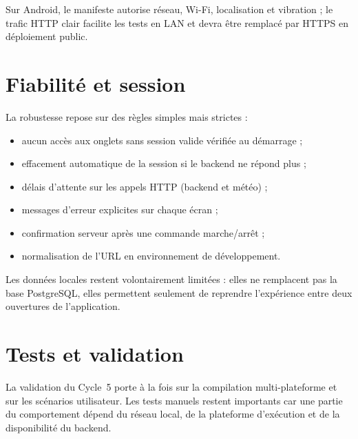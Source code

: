 \documentclass[a4paper,12pt]{report}
\begin{document}
	Sur Android, le manifeste autorise réseau, Wi-Fi, localisation et vibration ;
	le trafic HTTP clair facilite les tests en LAN et devra être remplacé par
	HTTPS en déploiement public.
	
	\section{Fiabilité et session}
	
	La robustesse repose sur des règles simples mais strictes :
	\begin{itemize}
		\item aucun accès aux onglets sans session valide vérifiée au démarrage ;
		\item effacement automatique de la session si le backend ne répond plus ;
		\item délais d'attente sur les appels HTTP (backend et météo) ;
		\item messages d'erreur explicites sur chaque écran ;
		\item confirmation serveur après une commande marche/arrêt ;
		\item normalisation de l'URL en environnement de développement.
	\end{itemize}
	
	Les données locales restent volontairement limitées : elles ne remplacent pas
	la base PostgreSQL, elles permettent seulement de reprendre l'expérience entre
	deux ouvertures de l'application.
	
	\section{Tests et validation}
	
	La validation du Cycle~5 porte à la fois sur la compilation multi-plateforme et
	sur les scénarios utilisateur. Les tests manuels restent importants car une
	partie du comportement dépend du réseau local, de la plateforme d'exécution et
	de la disponibilité du backend.
	
\end{document}
